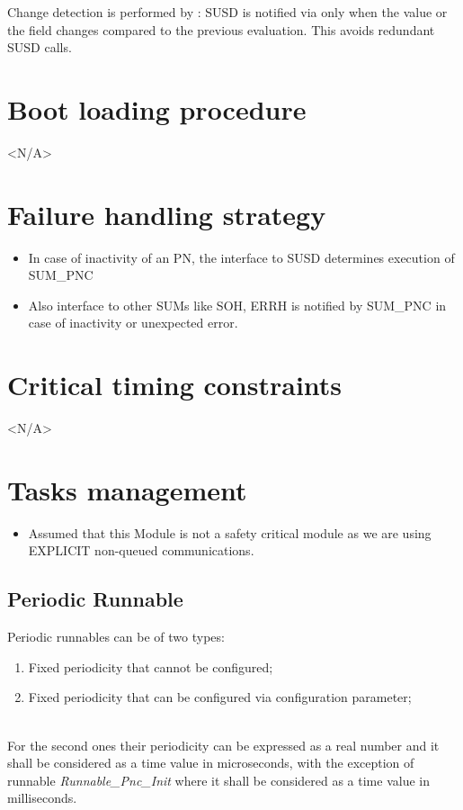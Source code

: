 Change detection is performed by : SUSD is notified via  only when the  value or the  field changes compared to the previous evaluation. This avoids redundant SUSD calls.

{ }

\section{Boot loading procedure}
<N/A>

\section{Failure handling strategy}

\begin{itemize}
	\item In case of inactivity of an PN, the interface to SUSD determines execution of SUM_PNC
	\item Also interface to other SUMs like SOH, ERRH is notified by SUM_PNC in case of inactivity or unexpected error.
\end{itemize}

\section{Critical timing constraints}
<N/A>

\section{Tasks management}

\begin{itemize}
	\item Assumed that this Module is not a safety critical module as we are using EXPLICIT non-queued communications.
\end{itemize}

\subsection{Periodic Runnable}
\label{subsec:periodic}
Periodic runnables can be of two types:

\begin{enumerate}
	\item Fixed periodicity that cannot be configured;
	\item Fixed periodicity that can be configured via configuration parameter;
\end{enumerate}
\\
For the second ones their periodicity can be expressed as a real number and it shall be considered as a time value in microseconds, with the exception of runnable \textit{Runnable_Pnc_Init} where it shall be considered as a time value in milliseconds.
\\

